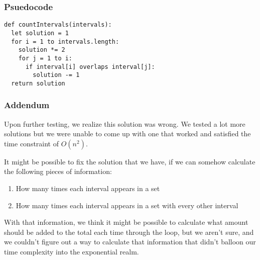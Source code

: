\documentclass{math}
\begin{document}
\subsubsection*{Psuedocode}
\begin{lstlisting}
def countIntervals(intervals):
  let solution = 1
  for i = 1 to intervals.length:
    solution *= 2
    for j = 1 to i:
      if interval[i] overlaps interval[j]:
        solution -= 1
  return solution
\end{lstlisting}

\subsubsection*{Addendum}
Upon further testing, we realize this solution was wrong. We tested a lot more
solutions but we were unable to come up with one that worked and satisfied
the time constraint of \( O(n^2) \).

It might be possible to fix the solution that we have, if we can somehow
calculate the following pieces of information:
\begin{enumerate}
  \item How many times each interval appears in a set
  \item How many times each interval appears in a set with every other interval
\end{enumerate}

With that information, we think it might be possible to calculate what amount
should be added to the total each time through the loop, but we aren't sure,
and we couldn't figure out a way to calculate that information that didn't
balloon our time complexity into the exponential realm.
\end{document}

